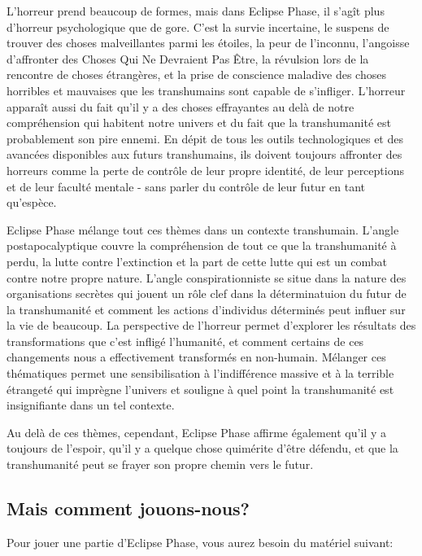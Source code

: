 L'horreur prend beaucoup de formes, mais dans Eclipse Phase, il s'agît plus d'horreur psychologique que de gore. C'est la survie incertaine, le suspens de trouver des choses malveillantes parmi les étoiles, la peur de l'inconnu, l'angoisse d'affronter des Choses Qui Ne Devraient Pas Être, la révulsion lors de la rencontre de choses étrangères, et la prise de conscience maladive des choses horribles et mauvaises que les transhumains sont capable de s'infliger. L'horreur apparaît aussi du fait qu'il y a des choses effrayantes au delà de notre compréhension qui habitent notre univers et du fait que la transhumanité est probablement son pire ennemi. En dépit de tous les outils technologiques et des avancées disponibles aux futurs transhumains, ils doivent toujours affronter des horreurs comme la perte de contrôle de leur propre identité, de leur perceptions et de leur faculté mentale - sans parler du contrôle de leur futur en tant qu'espèce. 

Eclipse Phase mélange tout ces thèmes dans un contexte transhumain. L'angle postapocalyptique couvre la compréhension de tout ce que la transhumanité à perdu, la lutte contre l'extinction et la part de cette lutte qui est un combat contre notre propre nature. L'angle conspirationniste se situe dans la nature des organisations secrètes qui jouent un rôle clef dans la déterminatuion du futur de la transhumanité et comment les actions d'individus déterminés peut influer sur la vie de beaucoup. La perspective de l'horreur permet d'explorer les résultats des transformations que c'est infligé l'humanité, et comment certains de ces changements nous a effectivement transformés en non-humain. Mélanger ces thématiques permet une sensibilisation à l'indifférence massive et à la terrible étrangeté qui imprègne l'univers et souligne à quel point la transhumanité est insignifiante dans un tel contexte. 

Au delà de ces thèmes, cependant, Eclipse Phase affirme également qu'il y a toujours de l'espoir, qu'il y a quelque chose quimérite d'être défendu, et que la transhumanité peut se frayer son propre chemin vers le futur. 



\subsection{Mais comment jouons-nous?} \label{sec:but-how-do} 

Pour jouer une partie d'Eclipse Phase, vous aurez besoin du matériel suivant: 

